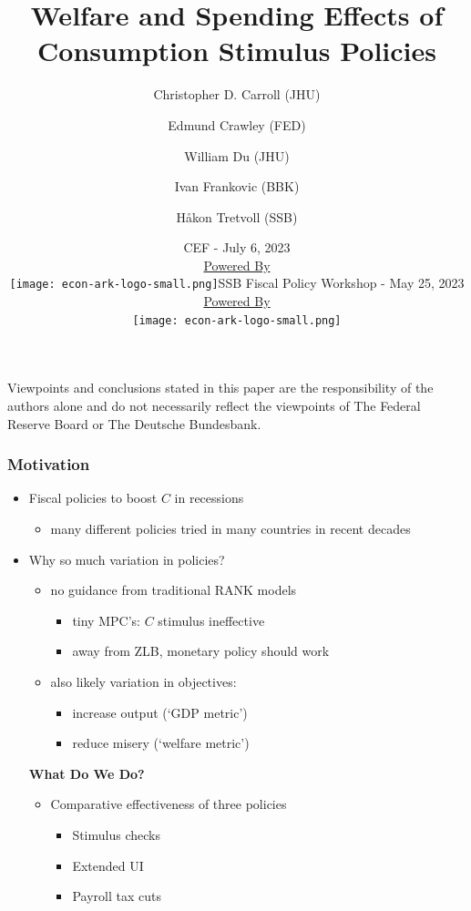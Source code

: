 \documentclass[pdflatex,aspectratio=169]{beamer}
\title[Stimulus]{Welfare and Spending Effects of Consumption Stimulus Policies}
\author{
  Christopher D. Carroll (JHU)
  \and
  Edmund Crawley (FED)
  \and
  William Du (JHU)
  \and
  Ivan Frankovic (BBK)
  \and
  H{\aa}kon Tretvoll (SSB)
}
\date[\today]{CEF - July 6, 2023  \\ \medskip \medskip \medskip
        \href{https://econ-ark.org/}{\small Powered By} \\ \texttt{[image: econ-ark-logo-small.png]}}}{}
\date[\today]{SSB Fiscal Policy Workshop - May 25, 2023  \\ \medskip \medskip \medskip 
          \href{https://econ-ark.org/}{\small Powered By} \\ \texttt{[image: econ-ark-logo-small.png]}}}{}
\begin{document}


\begin{frame}[plain]
  \titlepage
  
  \footnotesize{Viewpoints and conclusions stated in this paper are the responsibility of the authors alone
    and do not necessarily reflect the viewpoints of The Federal Reserve Board or The Deutsche Bundesbank.}
\end{frame}




\begin{frame}
  \frametitle{Motivation}
  \begin{itemize}[<+->]
  \item Fiscal policies to boost $C$ in recessions
    \begin{itemize}[<+->]
    \item many different policies tried in many countries in recent decades  
    \end{itemize}
  \item Why so much variation in policies? 
    \begin{itemize}[<+->]
      \itemsep = .25\bigskipamount 
    \item no guidance from traditional RANK models	
      \begin{itemize}[<+->]
      \item tiny MPC's: $C$ stimulus ineffective
      \item away from ZLB, monetary policy should work
      \end{itemize}
    \item also likely variation in objectives:
      \begin{itemize}[<+->]
      \item increase output (`GDP metric')
      \item reduce misery (`welfare metric')
      \end{itemize}
    \end{itemize}
    \bigskip
    \pause
  \textbf{What Do We Do?}
  \begin{itemize}[<+->]
    \item Comparative effectiveness of three policies
    \begin{itemize}[<+->]
      \item Stimulus checks
      \item Extended UI
      \item Payroll tax cuts
      \end{itemize}
  \end{itemize}
\end{itemize}
\end{frame}
\end{document}
